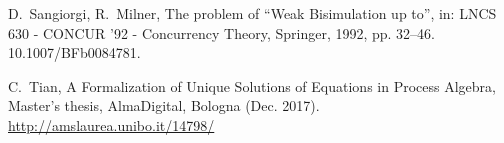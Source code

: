\documentclass[GCNS]{yincog}
\theoremstyle{remark}
\theoremstyle{theorem}
\theoremstyle{remark}
\begin{document}
\begin{backmatter}
\begin{thebibliography}{}
\begin{bsubitem}
\begin{bcontribution}%
\end{bcontribution}
\begin{bhost}
\begin{beditedbook}
\end{beditedbook}
\end{bhost}
\end{bsubitem}
%
\OrigBibText
D.~Sangiorgi, R.~Milner, {The problem of ``Weak Bisimulation up to''},
in: LNCS 630 - CONCUR '92 - Concurrency Theory, Springer, 1992, pp. 32--46.
10.1007/BFb0084781.
\endOrigBibText
{}%
\endbibitem

\begin{bsubitem}
\begin{bcontribution}%
\end{bcontribution}
\prnsep{,\ }
\begin{bhost}
\begin{bbook}%
\end{bbook}
\end{bhost}
\begin{bhost}
\begin{behost}
\end{behost}
\end{bhost}
\end{bsubitem}
%
\OrigBibText
C.~Tian,
{{A Formalization of Unique
Solutions of Equations in Process Algebra}}, Master's thesis, AlmaDigital,
Bologna (Dec. 2017).
 \url{http://amslaurea.unibo.it/14798/}
\endOrigBibText
{}%
\endbibitem


\end{thebibliography}
\end{backmatter}
\end{document}
